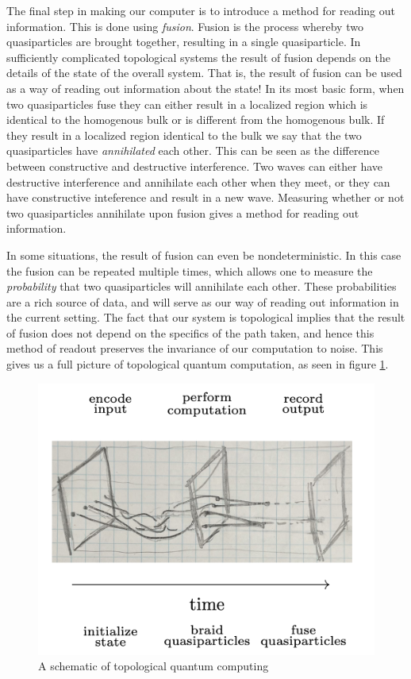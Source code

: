 \documentclass{article}
\theoremstyle{definition}
\newcommand{\0}{\left|0\right>}
\newcommand{\1}{\left|1\right>}
\numberwithin{figure}{section}
\begin{document}
The final step in making our computer is to introduce a method for reading out information. This is done using \textit{fusion}. Fusion is the process whereby two quasiparticles are brought together, resulting in a single quasiparticle. In sufficiently complicated topological systems the result of fusion depends on the details of the state of the overall system. That is, the result of fusion can be used as a way of reading out information about the state! In its most basic form, when two quasiparticles fuse they can either result in a localized region which is identical to the homogenous bulk or is different from the homogenous bulk. If they result in a localized region identical to the bulk we say that the two quasiparticles have \textit{annihilated} each other. This can be seen as the difference between constructive and destructive interference. Two waves can either have destructive interference and annihilate each other when they meet, or they can have constructive inteference and result in a new wave. Measuring whether or not two quasiparticles annihilate upon fusion gives a method for reading out information.

In some situations, the result of fusion can even be nondeterministic. In this case the fusion can be repeated multiple times, which allows one to measure the \textit{probability} that two quasiparticles will annihilate each other. These probabilities are a rich source of data, and will serve as our way of reading out information in the current setting. The fact that our system is topological implies that the result of fusion does not depend on the specifics of the path taken, and hence this method of readout preserves the invariance of our computation to noise. This gives us a full picture of topological quantum computation, as seen in figure \ref{fig:TQC-outline}.

\begin{figure}
\begin{center}
\includegraphics[scale=0.35]{TQC-outline}
\caption{A schematic of topological quantum computing}
\label{fig:TQC-outline}
\end{center}
\end{figure}
\end{document}
